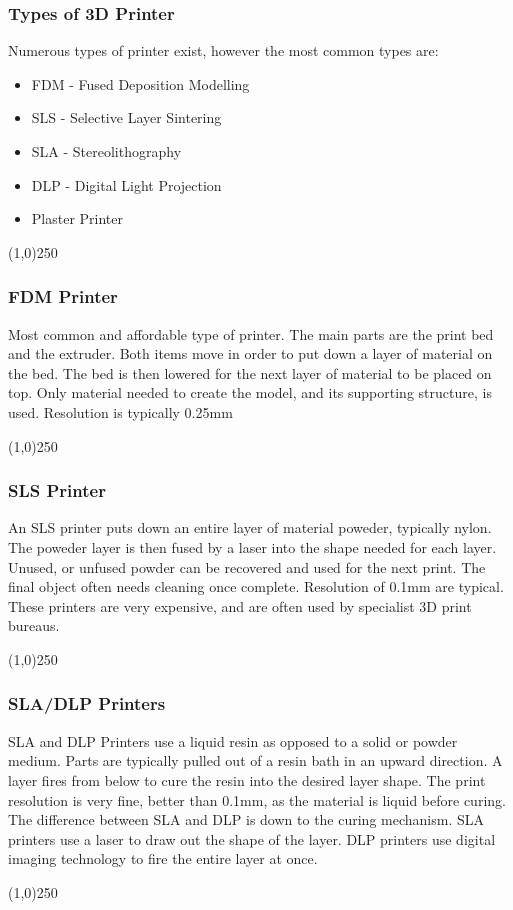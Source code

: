\begin{frame}
\frametitle{Types of 3D Printer}
Numerous types of printer exist, however the most common types are:
\begin{itemize}
	\item FDM - Fused Deposition Modelling
	\item SLS - Selective Layer Sintering
	\item SLA - Stereolithography
	\item DLP - Digital Light Projection
	\item Plaster Printer
\end{itemize}
\end{frame}
\begin{center}\line(1,0){250}\end{center}

\begin{frame}
\frametitle{FDM Printer}
Most common and affordable type of printer.  The main parts are the print bed and the extruder.  Both items move in order to put down a layer of material on the bed. The bed is then lowered for the next layer of material to be placed on top.  Only material needed to create the model, and its supporting structure, is used.  Resolution is typically 0.25mm
\end{frame}
\begin{center}\line(1,0){250}\end{center}



\begin{frame}
\frametitle{SLS Printer}
An SLS printer puts down an entire layer of material poweder, typically nylon.  The poweder layer is then fused by a laser into the shape needed for each layer.  Unused, or unfused powder can be recovered and used for the next print.  The final object often needs cleaning once complete.  Resolution of 0.1mm are typical.  These printers are very expensive, and are often used by specialist 3D print bureaus.
\end{frame}
\begin{center}\line(1,0){250}\end{center}


\begin{frame}
\frametitle{SLA/DLP Printers}
SLA and DLP Printers use a liquid resin as opposed to a solid or powder medium.  Parts are typically pulled out of a resin bath in an upward direction.  A layer fires from below to cure the resin into the desired layer shape.  The print resolution is very fine, better than 0.1mm, as the material is liquid before curing.\\
The difference between SLA and DLP is down to the curing mechanism.  SLA printers use a laser to draw out the shape of the layer.  DLP printers use digital imaging technology to fire the entire layer at once.

\end{frame}
\begin{center}\line(1,0){250}\end{center}


